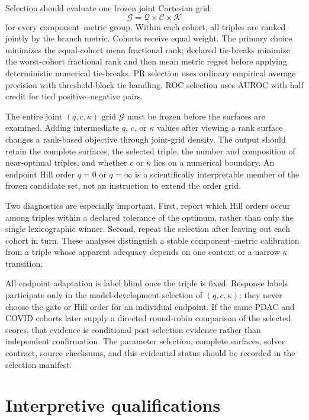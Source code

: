 \documentclass[11pt]{article}
\begin{document}
Selection should evaluate one frozen joint Cartesian grid
\begin{equation}
\mathcal G=\mathcal Q\times\mathcal C\times\mathcal K
\end{equation}
for every component--metric group. Within each cohort, all triples are ranked
jointly by the branch metric. Cohorts receive equal weight. The primary choice
minimizes the equal-cohort mean fractional rank; declared tie-breaks minimize
the worst-cohort fractional rank and then mean metric regret before applying
deterministic numerical tie-breaks. PR selection uses ordinary empirical
average precision with threshold-block tie handling. ROC selection uses AUROC
with half credit for tied positive--negative pairs.

The entire joint $(q,c,\kappa)$ grid $\mathcal G$ must be frozen before the
surfaces are examined. Adding intermediate $q$, $c$, or $\kappa$ values after
viewing a rank surface changes a rank-based objective through joint-grid
density.
The output should retain the complete surfaces, the selected triple, the
number and composition of near-optimal triples, and whether $c$ or $\kappa$
lies on a numerical boundary. An endpoint Hill order $q=0$ or $q=\infty$ is a
scientifically interpretable member of the frozen candidate set, not an
instruction to extend the order grid.

Two diagnostics are especially important. First, report which Hill orders
occur among triples within a declared tolerance of the optimum, rather than
only the single lexicographic winner. Second, repeat the selection after
leaving out each cohort in turn. These analyses distinguish a stable
component--metric calibration from a triple whose apparent adequacy depends
on one context or a narrow $\kappa$ transition.

All endpoint adaptation is label blind once the triple is fixed. Response
labels participate only in the model-development selection of
$(q,c,\kappa)$; they never choose the gate or Hill order for an individual
endpoint. If the same PDAC and COVID cohorts later supply a directed
round-robin comparison of the selected scores, that evidence is conditional
post-selection evidence rather than independent confirmation. The parameter
selection, complete surfaces, solver contract, source checksums, and this
evidential status should be recorded in the selection manifest.

\section{Interpretive qualifications}
\end{document}
